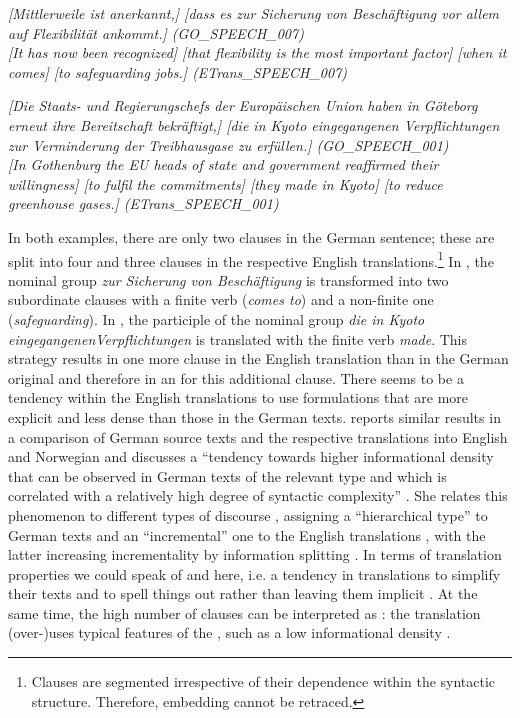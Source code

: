 \documentclass[output=paper]{LSP/langsci}
\begin{document}
\ea \label{ex:culo:12}
  \ea \textit{[Mittlerweile ist anerkannt,] [dass es zur Sicherung von Beschäftigung vor allem auf   Flexibilität ankommt.] \textup{(GO\_SPEECH\_007)}}\\
  
  
    \ex \textit{[It has now been recognized] [that flexibility is the most important factor] [when it comes] [to safeguarding jobs.] \textup{(ETrans\_SPEECH\_007)}}
    \z
\z 

\ea \label{ex:culo:13}
   \ea \textit{[Die Staats- und Regierungschefs der Europäischen Union haben in Göteborg erneut   ihre Bereitschaft bekräftigt,] [die in Kyoto eingegangenen Verpflichtungen zur   Verminderung der Treibhausgase zu erfüllen.] \textup{(GO\_SPEECH\_001)}}\\
   \ex \textit{[In Gothenburg the EU heads of state and government reaffirmed their willingness] [to fulfil the commitments] [they made in Kyoto] [to reduce greenhouse gases.] \textup{(ETrans\_SPEECH\_001)}}
   \z
\z

In both examples, there are only two clauses in the German sentence; these are split into four and three clauses in the respective English translations.\footnote{Clauses are segmented irrespective of their dependence within the syntactic structure. Therefore, embedding cannot be retraced.} In , the nominal group \textit{zur Sicherung von Beschäftigung} is transformed into two subordinate clauses with a finite verb (\textit{comes to}) and a non-finite one (\textit{safeguarding}). In , the participle of the nominal group \textit{die in Kyoto }\textit{eingegangenen}\textit{Verpflichtungen} is translated with the finite verb \textit{made}. This strategy results in one more clause in the English translation than in the German original and therefore in an  for this additional clause. There seems to be a tendency within the English translations to use formulations that are more explicit and less dense than those in the German texts. \citet{Fabricius-Hansen1998} reports similar results in a comparison of German source texts and the respective translations into English and Norwegian and discusses a ``tendency towards higher informational density that can be observed in German texts of the relevant type and which is correlated with a relatively high degree of syntactic complexity'' \citep[197]{Fabricius-Hansen1998}. She relates this phenomenon to different types of discourse , assigning a ``hierarchical type'' to German texts and an ``incremental'' one to the English translations \citep[202--203]{Fabricius-Hansen1998}, with the latter increasing incrementality by information splitting \citep[231]{Fabricius-Hansen1998}. In terms of translation properties we could speak of  and  here, i.e. a tendency in translations to simplify their texts and to spell things out rather than leaving them implicit \citep[180-181]{Baker1996}. At the same time, the high number of clauses can be interpreted as : the translation (over-)uses typical features of the , such as a low informational density \citep[183]{Baker1996}.
\end{document}
